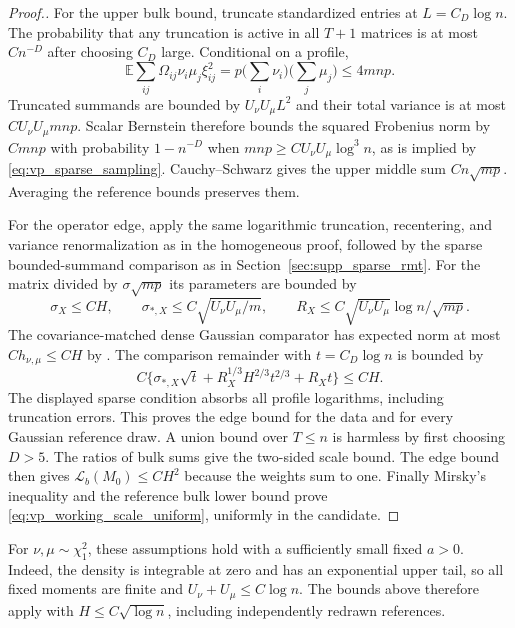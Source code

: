 \documentclass[numsec,webpdf,modern,large,namedate]{oup-authoring-template}
\theoremstyle{plain}
\theoremstyle{remark}
\newif\ifmarkchanges
\newenvironment{revision}{\begingroup\ifmarkchanges\color{red}\fi}{\endgroup}
\begin{document}
\begin{revision}
\begin{proof}[Proof.]
For the upper bulk bound, truncate standardized entries at $L=C_D\log n$.
The probability that any truncation is active in all $T+1$ matrices is at
most $Cn^{-D}$ after choosing $C_D$ large.  Conditional on a profile,
\[
 \mathbb E\sum_{ij}\Omega_{ij}\nu_i\mu_j\xi_{ij}^2
       =p\Big(\sum_i\nu_i\Big)\Big(\sum_j\mu_j\Big)\le4mnp.
\]
Truncated summands are bounded by $U_\nu U_\mu L^2$ and their total
variance is at most $C U_\nu U_\mu mnp$.  Scalar Bernstein therefore
bounds the squared Frobenius norm by $Cmnp$ with probability $1-n^{-D}$
when $mnp\ge C U_\nu U_\mu\log^3 n$, as is implied by
\eqref{eq:vp_sparse_sampling}.  Cauchy--Schwarz gives the upper middle
sum $Cn\sqrt{mp}$.  Averaging the reference bounds preserves them.

For the operator edge, apply the same logarithmic truncation, recentering,
and variance renormalization as in the homogeneous proof, followed by the
sparse bounded-summand comparison as in Section~\ref{sec:supp_sparse_rmt}.
For the matrix divided by $\sigma\sqrt{mp}$ its parameters are bounded by
\[
 \sigma_X\le CH,\qquad
 \sigma_{*,X}\le C\sqrt{U_\nu U_\mu/m},\qquad
 R_X\le C\sqrt{U_\nu U_\mu}\log n/\sqrt{mp}.
\]
The covariance-matched dense Gaussian comparator has expected norm at most
$Ch_{\nu,\mu}\le CH$ by
\citet{latala2005some}.  The comparison remainder with $t=C_D\log n$
is bounded by
\[
 C\{\sigma_{*,X}\sqrt t+R_X^{1/3}H^{2/3}t^{2/3}+R_Xt\}\le CH.
\]
The displayed sparse condition absorbs all profile logarithms, including
truncation errors.  This proves the edge bound for the data and for every
Gaussian reference draw.  A union bound over $T\le n$ is harmless by
first choosing $D>5$.
The ratios of bulk sums give the two-sided scale bound.  The edge bound
then gives $\mathcal L_b(M_0)\le CH^2$ because the weights sum to one.
Finally Mirsky's inequality and the reference bulk lower bound prove
\eqref{eq:vp_working_scale_uniform}, uniformly in the candidate.
\end{proof}

For $\nu,\mu\sim\chi_1^2$, these assumptions hold with a sufficiently
small fixed $a>0$. Indeed, the density is integrable at zero and has an
exponential upper tail, so all fixed moments are finite and
$U_\nu+U_\mu\le C\log n$. The bounds above therefore apply with
$H\le C\sqrt{\log n}$, including independently redrawn references.



\end{revision}
\end{document}
